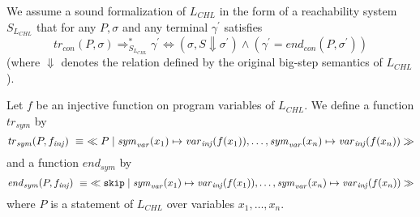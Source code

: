 \begin{assumption}\label{a:sf}
    We assume a sound formalization of $L_{\mathit{CHL}}$ in the form of a reachability system
    $S_{L_{\mathit{CHL}}}$ that for any $P,\sigma$ and any terminal $\gamma^\prime$ satisfies
    \begin{equation*}
        \mathit{tr}_{\mathit{con}}(P, \sigma) \Rightarrow^*_{S_{L_{\mathit{CHL}}}} \gamma^\prime
        \iff
        (\sigma, S \Downarrow \sigma^\prime) \land (\gamma^\prime = \mathit{end}_{\mathit{con}}(P, \sigma^\prime))
    \end{equation*}
    (where $\Downarrow$ denotes the relation defined by the original big-step semantics of $L_{\mathit{CHL}}$).
\end{assumption}

\begin{definition}
    Let $f$ be an injective function on program variables of $L_{\mathit{CHL}}$.
    We define a function $\mathit{tr}_{\mathit{sym}}$ by
    \begin{equation*}
        \mathit{tr}_{\mathit{sym}}(P, f_{\mathit{inj}}) \ \equiv \
        \impConfig{P}{
            \mathit{sym}_\mathit{var}(x_1) \mapsto \mathit{var}_{\mathit{inj}}(f(x_1)),
            \ldots,
            \mathit{sym}_\mathit{var}(x_n) \mapsto \mathit{var}_{\mathit{inj}}(f(x_n))
        }%
    \end{equation*}
    and a function $\mathit{end}_{\mathit{sym}}$ by
    \begin{equation*}
       \mathit{end}_{\mathit{sym}}(P, f_{\mathit{inj}}) \ \equiv \ 
       \impConfig{\texttt{skip}}{
           \mathit{sym}_\mathit{var}(x_1) \mapsto \mathit{var}_{\mathit{inj}}(f(x_1)),
           \ldots,
           \mathit{sym}_\mathit{var}(x_n) \mapsto \mathit{var}_{\mathit{inj}}(f(x_n))
       }
    \end{equation*}
    where $P$ is a statement of $L_{\mathit{CHL}}$ over variables $x_1,\ldots,x_n$.
\end{definition}


